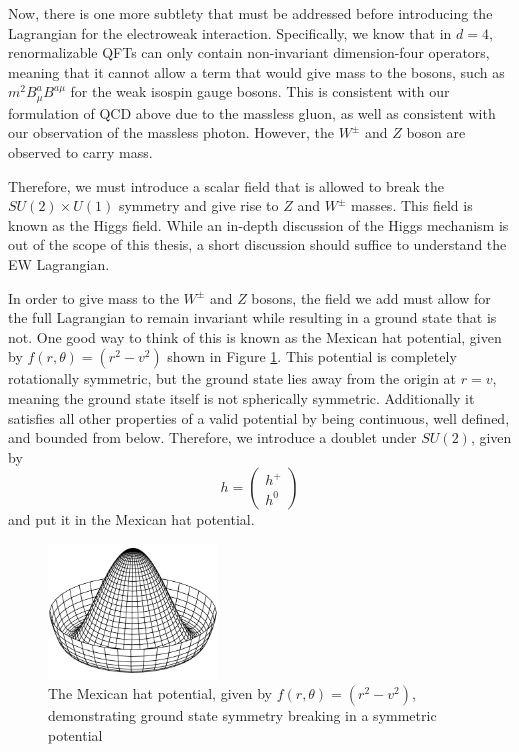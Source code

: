 Now, there is one more subtlety that must be addressed before introducing the Lagrangian for the electroweak interaction. Specifically, we know that in $d=4$, renormalizable QFTs can only contain non-invariant dimension-four operators, meaning that it cannot allow a term that would give mass to the bosons, such as $m^2 B_{\mu}^aB^{a\mu}$ for the weak isospin gauge bosons.  This is consistent with our formulation of QCD above due to the massless gluon, as well as consistent with our observation of the massless photon. However, the $W^\pm$ and $Z$ boson are observed to carry mass.

Therefore, we must introduce a scalar field that is allowed to break the $SU(2) \times U(1)$ symmetry and give rise to $Z$ and $W^\pm$ masses. This field is known as the Higgs field. While an in-depth discussion of the Higgs mechanism is out of the scope of this thesis, a short discussion should suffice to understand the EW Lagrangian.

In order to give mass to the $W^\pm$ and $Z$ bosons, the field we add must allow for the full Lagrangian to remain invariant while resulting in a ground state that is not. One good way to think of this is known as the Mexican hat potential, given by $f(r, \theta) = (r^2 - v^2)$ shown in Figure \ref{fig:Mexican_hat_potential}. This potential is completely rotationally symmetric, but the ground state lies away from the origin at $r = v$, meaning the ground state itself is not spherically symmetric. Additionally it satisfies all other properties of a valid potential by being continuous, well defined, and bounded from below. Therefore, we introduce a doublet under $SU(2)$, given by
\begin{equation}
h = \begin{pmatrix}
h^+ \\ h^0
\end{pmatrix}
\end{equation}
and put it in the Mexican hat potential. 

\begin{figure}[ht!]
    \centering
    \includegraphics[width=0.4\textwidth]{figures/chapter2/Mexican_hat_potential.png}
    \caption{The Mexican hat potential, given by $f(r, \theta) = (r^2 - v^2)$, demonstrating ground state symmetry breaking in a symmetric potential}
    \label{fig:Mexican_hat_potential}
\end{figure}

